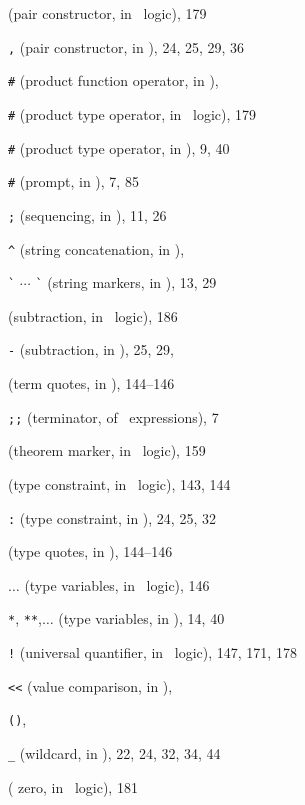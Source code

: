 \begin{theindex}
  \item \ml{,} (pair constructor, in \HOL\ logic), 179
  \item {\small\verb+,+} (pair constructor, in \ML), 24, 25, 29, 36
  \item {\small\verb+#+} (product function operator, in \ML), 
  \item {\small\verb+#+} (product type operator, in \HOL\ logic), 179
  \item {\small\verb+#+} (product type operator, in \ML), 9, 40
  \item {\small\verb+#+} (prompt, in \ML), 7, 85
  \item {\small\verb+;+} (sequencing, in \ML), 11, 26
  \item {\small\verb+^+} (string concatenation, in \ML), 
  \item {\small\verb+`+ $\cdots$ \verb+`+} (string markers, in \ML), 13, 
		29
  \item \ml{-} (subtraction, in \HOL\ logic), 186
  \item {\small\verb+-+} (subtraction, in \ML), 25, 29, 
  \item {} (term quotes, in \ML), 144--146
  \item {\small\verb+;;+} (terminator, of \ML\ expressions), 7
  \item \ml{|-} (theorem marker, in \HOL\ logic), 159
  \item \ml{:} (type constraint, in \HOL\ logic), 143, 144
  \item {\small\verb+:+} (type constraint, in \ML), 24, 25, 32
  \item {} (type quotes, in \ML), 144--146
  \item \ml{*,\,**,\,}$\ldots$ (type variables, in \HOL\ logic), 146
  \item {\small\verb+*+, \verb+**+,$\ldots$} (type variables, in \ML), 
		14, 40
  \item {\small\verb+!+} (universal quantifier, in \HOL\ logic), 147, 
		171, 178
  \item {\small\verb+<<+} (value comparison, in \ML), 
  \item \verb+()+, 
  \item {\small\verb+_+} (wildcard, in \ML), 22, 24, 32, 34, 44
  \item {} ( zero, in \HOL\ logic), 181

  \indexspace


\end{theindex}
